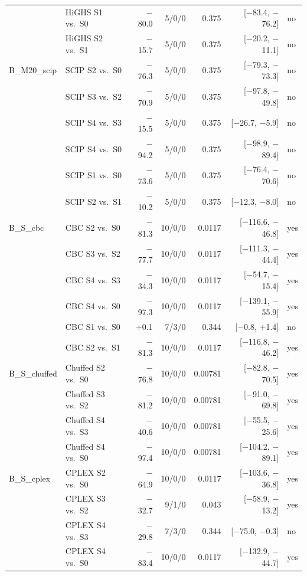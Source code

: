 \begin{longtable}{llrrrrl}
 & HiGHS S1 vs.\ S0 & $-$80.0 & 5/0/0 & 0.375 & [$-$83.4, $-$76.2] & no \\
 & HiGHS S2 vs.\ S1 & $-$15.7 & 5/0/0 & 0.375 & [$-$20.2, $-$11.1] & no \\
B\_M20\_scip & SCIP S2 vs.\ S0 & $-$76.3 & 5/0/0 & 0.375 & [$-$79.3, $-$73.3] & no \\
 & SCIP S3 vs.\ S2 & $-$70.9 & 5/0/0 & 0.375 & [$-$97.8, $-$49.8] & no \\
 & SCIP S4 vs.\ S3 & $-$15.5 & 5/0/0 & 0.375 & [$-$26.7, $-$5.9] & no \\
 & SCIP S4 vs.\ S0 & $-$94.2 & 5/0/0 & 0.375 & [$-$98.9, $-$89.4] & no \\
 & SCIP S1 vs.\ S0 & $-$73.6 & 5/0/0 & 0.375 & [$-$76.4, $-$70.6] & no \\
 & SCIP S2 vs.\ S1 & $-$10.2 & 5/0/0 & 0.375 & [$-$12.3, $-$8.0] & no \\
B\_S\_cbc & CBC S2 vs.\ S0 & $-$81.3 & 10/0/0 & 0.0117 & [$-$116.6, $-$46.8] & yes \\
 & CBC S3 vs.\ S2 & $-$77.7 & 10/0/0 & 0.0117 & [$-$111.3, $-$44.4] & yes \\
 & CBC S4 vs.\ S3 & $-$34.3 & 10/0/0 & 0.0117 & [$-$54.7, $-$15.4] & yes \\
 & CBC S4 vs.\ S0 & $-$97.3 & 10/0/0 & 0.0117 & [$-$139.1, $-$55.9] & yes \\
 & CBC S1 vs.\ S0 & +0.1 & 7/3/0 & 0.344 & [$-$0.8, +1.4] & no \\
 & CBC S2 vs.\ S1 & $-$81.3 & 10/0/0 & 0.0117 & [$-$116.8, $-$46.2] & yes \\
B\_S\_chuffed & Chuffed S2 vs.\ S0 & $-$76.8 & 10/0/0 & 0.00781 & [$-$82.8, $-$70.5] & yes \\
 & Chuffed S3 vs.\ S2 & $-$81.2 & 10/0/0 & 0.00781 & [$-$91.0, $-$69.8] & yes \\
 & Chuffed S4 vs.\ S3 & $-$40.6 & 10/0/0 & 0.00781 & [$-$55.5, $-$25.6] & yes \\
 & Chuffed S4 vs.\ S0 & $-$97.4 & 10/0/0 & 0.00781 & [$-$104.2, $-$89.1] & yes \\
B\_S\_cplex & CPLEX S2 vs.\ S0 & $-$64.9 & 10/0/0 & 0.0117 & [$-$103.6, $-$36.8] & yes \\
 & CPLEX S3 vs.\ S2 & $-$32.7 & 9/1/0 & 0.043 & [$-$58.9, $-$13.2] & yes \\
 & CPLEX S4 vs.\ S3 & $-$29.8 & 7/3/0 & 0.344 & [$-$75.0, $-$0.3] & no \\
 & CPLEX S4 vs.\ S0 & $-$83.4 & 10/0/0 & 0.0117 & [$-$132.9, $-$44.7] & yes \\

\end{longtable}
